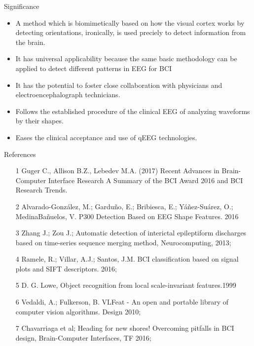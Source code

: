 \documentclass[final,hyperref={pdfpagelabels=false}]{beamer}
\begin{document}
\begin{frame}[t]
\begin{columns}[t]
\begin{column}{.465\textwidth}
\begin{block}{Significance}
\begin{itemize}
\item A method which is biomimetically based on how the visual cortex works by detecting orientations, ironically, is used preciely to detect information from the brain.
\item It has universal applicability because the same basic methodology can be applied to detect different patterns in EEG for BCI
\item It has the potential to foster close collaboration with physicians and electroencephalograph technicians.
\item Follows the established procedure of the clinical EEG of analyzing waveforms by their shapes.
\item Eases the clinical acceptance and use of qEEG technologies.
\end{itemize}

\end{block}


\begin{block}{References}
              \begin{itemize}
                \item [1] \small Guger C., Allison B.Z., Lebedev M.A. (2017) Recent Advances in Brain-Computer Interface Research A Summary of the BCI Award 2016 and BCI Research Trends.
                \item [2] Alvarado-González, M.; Garduño, E.; Bribiesca, E.; Yáñez-Suárez, O.; MedinaBañuelos, V. P300 Detection Based on EEG Shape Features. 2016
                \item [3] Zhang J.; Zou J.; Automatic detection of interictal epileptiform discharges based on time-series sequence merging method, Neurocomputing, 2013;
                \item [4] Ramele, R.; Villar, A.J.; Santos, J.M. BCI classification based on signal plots and SIFT descriptors. 2016;
                \item [5] D. G. Lowe, Object recognition from local scale-invariant features.1999
                \item [6] Vedaldi, A.; Fulkerson, B. VLFeat - An open and portable library of computer vision algorithms. Design 2010;
                \item [7] Chavarriaga et al; Heading for new shores! Overcoming pitfalls in BCI design, Brain-Computer Interfaces, TF 2016;
              \end{itemize}
                      

\end{block}
\end{column}
\end{columns}
\end{frame}
\end{document}
